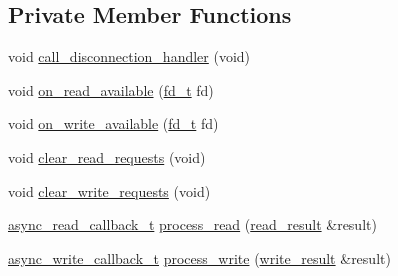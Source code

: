 \subsection*{Private Member Functions}
\begin{DoxyCompactItemize}
\item 
void \hyperlink{classtacopie_1_1tcp__client_ae38ae1f64909dd36592a02fc3c245672}{call\+\_\+disconnection\+\_\+handler} (void)
\item 
void \hyperlink{classtacopie_1_1tcp__client_acb08202e4ea7d85df4a6959dfe418eba}{on\+\_\+read\+\_\+available} (\hyperlink{namespacetacopie_acce7ad26b2d30156b1e6fa353f727026}{fd\+\_\+t} fd)
\item 
void \hyperlink{classtacopie_1_1tcp__client_aee290ddef8906d49edf3bdc9e3555d0a}{on\+\_\+write\+\_\+available} (\hyperlink{namespacetacopie_acce7ad26b2d30156b1e6fa353f727026}{fd\+\_\+t} fd)
\item 
void \hyperlink{classtacopie_1_1tcp__client_afdb370d07800a95448a645f4605d54e1}{clear\+\_\+read\+\_\+requests} (void)
\item 
void \hyperlink{classtacopie_1_1tcp__client_acd8c8d54f359ed99be3a2dd50ef0ec77}{clear\+\_\+write\+\_\+requests} (void)
\item 
\hyperlink{classtacopie_1_1tcp__client_acdf9dea8bac6c56f7b04ce38b9432322}{async\+\_\+read\+\_\+callback\+\_\+t} \hyperlink{classtacopie_1_1tcp__client_a40308b6a1642a79a35a2b2d9c9b9a3f7}{process\+\_\+read} (\hyperlink{structtacopie_1_1tcp__client_1_1read__result}{read\+\_\+result} \&result)
\item 
\hyperlink{classtacopie_1_1tcp__client_ad48b8c8dff8a77490eb2e3e802c82b97}{async\+\_\+write\+\_\+callback\+\_\+t} \hyperlink{classtacopie_1_1tcp__client_afd5e43d5f44930894de10ce05268607f}{process\+\_\+write} (\hyperlink{structtacopie_1_1tcp__client_1_1write__result}{write\+\_\+result} \&result)
\end{DoxyCompactItemize}
